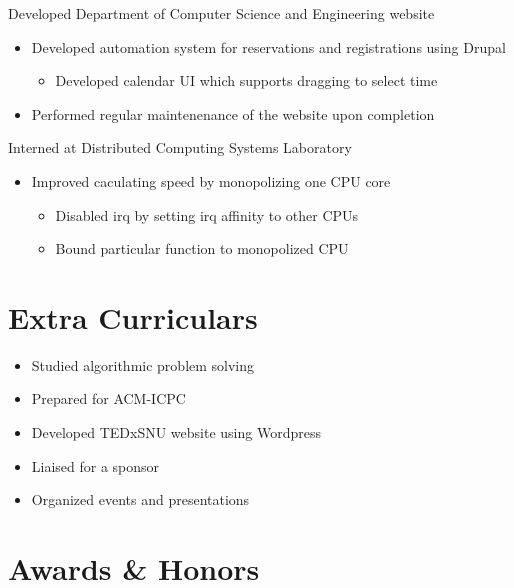 \documentclass[11pt,a4paper,sans]{moderncv}        %
\begin{document}
{Developed Department of Computer Science and Engineering website
  \begin{itemize}%
    \item Developed automation system for reservations and registrations using Drupal
      \begin{itemize}%
        \item Developed calendar UI which supports dragging to select time
      \end{itemize}
    \item Performed regular maintenenance of the website upon completion
\end{itemize}}

{Interned at Distributed Computing Systems Laboratory
  \begin{itemize}%
    \item Improved caculating speed by monopolizing one CPU core
      \begin{itemize}
        \item Disabled irq by setting irq affinity to other CPUs
        \item Bound particular function to monopolized CPU
      \end{itemize}
\end{itemize}}

\section{Extra Curriculars}
{\begin{itemize}%
    \item Studied algorithmic problem solving
    \item Prepared for ACM-ICPC
\end{itemize}}

{\begin{itemize}%
    \item Developed TEDxSNU website using Wordpress
    \item Liaised for a sponsor
    \item Organized events and presentations
\end{itemize}}

\section{Awards \& Honors}
\end{document}
